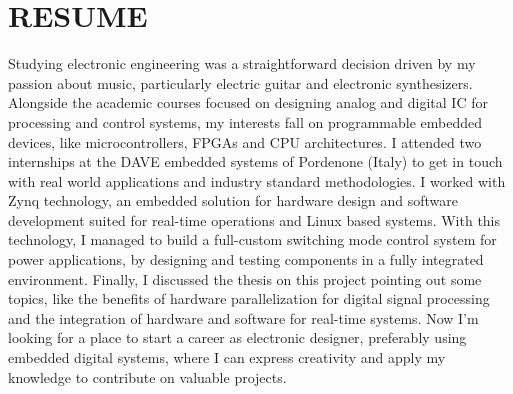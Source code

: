 \section{RESUME}
Studying electronic engineering was a straightforward decision driven by my passion about music, particularly electric guitar and electronic synthesizers.
Alongside the academic courses focused on designing analog and digital IC for processing and control systems, my interests fall on programmable embedded devices, like microcontrollers, FPGAs and CPU architectures.
I attended two internships at the DAVE embedded systems of Pordenone (Italy) to get in touch with real world applications and industry standard methodologies.
I worked with Zynq technology, an embedded solution for hardware design and software development suited for real-time operations and Linux based systems. 
With this technology, I managed to build a full-custom switching mode control system for power applications, by designing and testing components in a fully integrated environment.
Finally, I discussed the thesis on this project pointing out some topics, like the benefits of hardware parallelization for digital signal processing and the integration of hardware and software for real-time systems.
Now I'm looking for a place to start a career as electronic designer, preferably using embedded digital systems, where I can express creativity and apply my knowledge to contribute on valuable projects.
